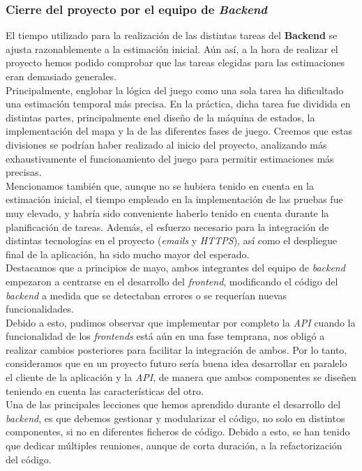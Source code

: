 \documentclass[11pt, a4paper, titlepage]{article}
\begin{document}
\subsubsection{Cierre del proyecto por el equipo de \textit{Backend}}
El tiempo utilizado para la realización de las distintas tareas del \textbf{Backend} se ajusta razonablemente a la estimación inicial.
Aún así, a la hora de realizar el proyecto hemos podido comprobar que las tareas elegidas para las estimaciones eran demasiado generales.\\

Principalmente, englobar la lógica del juego como una sola tarea ha dificultado una estimación temporal más precisa. En la práctica, dicha tarea fue dividida en distintas partes, principalmente enel diseño de la máquina de estados, la implementación del mapa y la de las diferentes fases de juego. Creemos que estas divisiones se podrían haber realizado al inicio del proyecto, analizando más exhaustivamente el funcionamiento del juego para permitir estimaciones más precisas. \\

Mencionamos también que, aunque no se hubiera tenido en cuenta en la estimación inicial, el tiempo empleado en la implementación de las pruebas fue muy elevado, y habría sido conveniente haberlo tenido en cuenta durante la planificación de tareas. Además, el esfuerzo necesario para la integración de distintas tecnologías en el proyecto (\textit{emails} y \textit{HTTPS}), así como el despliegue final de la aplicación, ha sido mucho mayor del esperado. \\

Destacamos que a principios de mayo, ambos integrantes del equipo de \textit{backend} empezaron a centrarse en el desarrollo del \textit{frontend}, modificando el código del \textit{backend} a medida que se detectaban errores o se requerían nuevas funcionalidades. \\

Debido a esto, pudimos observar que implementar por completo la \textit{API} cuando la funcionalidad de los \textit{frontends} está aún en una fase temprana, nos obligó a realizar cambios posteriores para facilitar la integración de ambos. Por lo tanto, consideramos que en un proyecto futuro sería buena idea desarrollar en paralelo el cliente de la aplicación y la \textit{API}, de manera que ambos componentes se diseñen teniendo en cuenta las características del otro. \\

Una de las principales lecciones que hemos aprendido durante el desarrollo del \textit{backend}, es que debemos gestionar y modularizar el código, no solo en distintos componentes, si no en diferentes ficheros de código. Debido a esto, se han tenido que dedicar múltiples reuniones, aunque de corta duración, a la refactorización del código.\\
\end{document}
